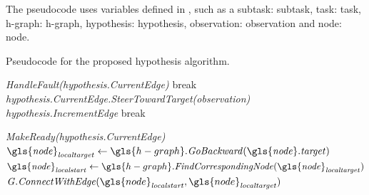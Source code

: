 The pseudocode uses variables defined in , such as a subtask: \gls{subtask}, task: \gls{task}, \ac{h-graph}: \gls{h-graph}, hypothesis: \gls{hypothesis}, observation: \gls{observation} and node: \gls{node}.\bs

\noindent
\begin{algorithm}[H]
  \caption{Pseudocode for the proposed hypothesis algorithm.}\label{pseudocode:h-algorithm}
  \begin{algorithmic}[1]

    \hspace{-0.9cm}\colorbox{my_grey}{\parbox{\linewidth}{%

        \hspace{-0.1cm}\colorbox{my_yellow}{\parbox{\linewidth}{%

            \hspace{-0.1cm}\colorbox{my_light_blue}{\parbox{\linewidth}{%
                 
                \State \textit{HandleFault(\gls{hypothesis}.CurrentEdge)}
                \State break
                \EndIf
                \State \textit{\gls{hypothesis}.CurrentEdge.SteerTowardTarget(\gls{observation})}
                  \State \textit{\gls{hypothesis}.IncrementEdge}
                \Else
                  \State break
                \EndIf
                \EndIf
                \EndWhile
            }}
            \Else
            \State \textit{MakeReady(\gls{hypothesis}.CurrentEdge)}
            \EndIf
            \Else
            \State $\mathit{\gls{node}_{localtarget}} \leftarrow \gls{h-graph}.\mathit{GoBackward(\gls{node}.target)}$
            \State $\mathit{\gls{node}_{localstart}} \leftarrow \gls{h-graph}.\mathit{FindCorrespondingNode(\gls{node}_{localtarget})}$
            \State $\mathit{G.ConnectWithEdge}(\gls{node}_\mathit{localstart}, \gls{node}_\mathit{localtarget})$
            \EndIf
            \EndWhile
        }}
        \EndFor
    }}
  \end{algorithmic}
\end{algorithm}

